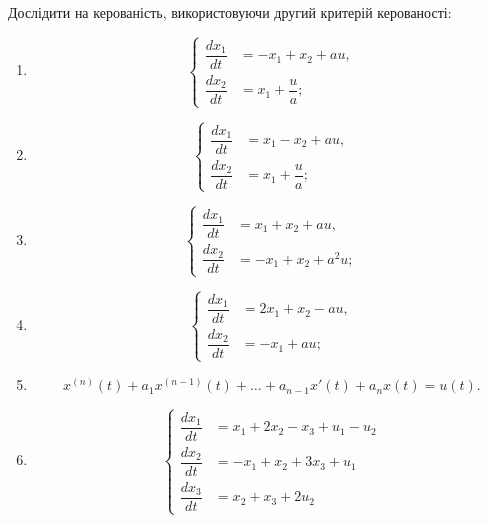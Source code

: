 \begin{problem}
    Дослідити на керованість, використовуючи другий критерій керованості:
    \begin{enumerate}
        \item \[ \left\{ \begin{aligned} \dfrac{dx_1}{dt} &= -x_1 + x_2 + au, \\ \dfrac{dx_2}{dt} &= x_1 + \dfrac ua; \end{aligned} \right. \]
        \item \[ \left\{ \begin{aligned} \dfrac{dx_1}{dt} &= x_1 - x_2 + au, \\ \dfrac{dx_2}{dt} &= x_1 + \dfrac ua; \end{aligned} \right. \] 
        \item \[ \left\{ \begin{aligned} \dfrac{dx_1}{dt} &= x_1 + x_2 + au, \\ \dfrac{dx_2}{dt} &= - x_1 + x_2 + a^2u; \end{aligned} \right. \]
        \item \[ \left\{ \begin{aligned} \dfrac{dx_1}{dt} &= 2x_1 + x_2 - au, \\ \dfrac{dx_2}{dt} &= - x_1 + au; \end{aligned} \right. \]
        \item \[ x^{(n)}(t) + a_1 x^{(n-1)}(t) + \ldots + a_{n-1}x'(t) + a_n x(t) = u(t). \]
        \item \[ \left\{ \begin{aligned} \dfrac{dx_1}{dt} &= x_1 + 2x_2 - x_3 + u_1 - u_2 \\ \dfrac{dx_2}{dt} &= -x_1 + x_2 + 3x_3 + u_1 \\ \dfrac{dx_3}{dt} &= x_2 + x_3 + 2u_2 \end{aligned} \right. \]
    \end{enumerate}
\end{problem}

